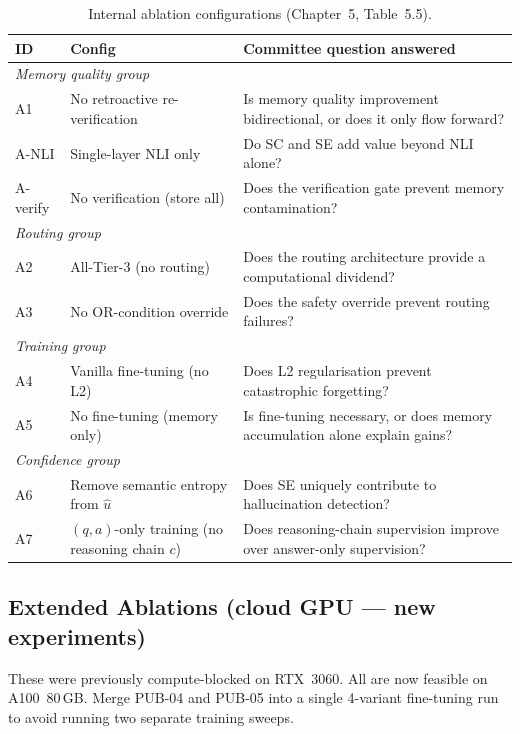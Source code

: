 \documentclass[12pt,a4paper]{article}
\newcommand{\uhat}{\hat{u}}
\begin{document}
\begin{table}[htbp]
\centering
\caption{Internal ablation configurations (Chapter~5, Table~5.5).}
\label{tab:ablations}
\renewcommand{\arraystretch}{1.3}
\begin{tabular}{@{}p{1.2cm}p{3.5cm}p{8.0cm}@{}}
\toprule
\textbf{ID} & \textbf{Config} & \textbf{Committee question answered} \\
\midrule
\multicolumn{3}{l}{\textit{Memory quality group}} \\
A1 & No retroactive re-verification &
  Is memory quality improvement bidirectional, or does it only flow forward? \\
A-NLI & Single-layer NLI only &
  Do SC and SE add value beyond NLI alone? \\
A-verify & No verification (store all) &
  Does the verification gate prevent memory contamination? \\
\midrule
\multicolumn{3}{l}{\textit{Routing group}} \\
A2 & All-Tier-3 (no routing) &
  Does the routing architecture provide a computational dividend? \\
A3 & No OR-condition override &
  Does the safety override prevent routing failures? \\
\midrule
\multicolumn{3}{l}{\textit{Training group}} \\
A4 & Vanilla fine-tuning (no L2) &
  Does L2 regularisation prevent catastrophic forgetting? \\
A5 & No fine-tuning (memory only) &
  Is fine-tuning necessary, or does memory accumulation alone explain gains? \\
\midrule
\multicolumn{3}{l}{\textit{Confidence group}} \\
A6 & Remove semantic entropy from $\uhat$ &
  Does SE uniquely contribute to hallucination detection? \\
A7 & $(q, a)$-only training (no reasoning chain $c$) &
  Does reasoning-chain supervision improve over answer-only supervision? \\
\bottomrule
\end{tabular}
\end{table}

\subsection{Extended Ablations (cloud GPU --- new experiments)}

These were previously compute-blocked on RTX~3060.
All are now feasible on A100~80\,GB.
Merge PUB-04 and PUB-05 into a single 4-variant fine-tuning run to avoid
running two separate training sweeps.
\end{document}
